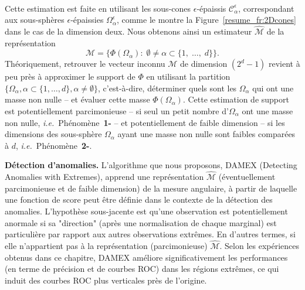 \documentclass[a4paper, 12pt]{article}
\newcommand{\ie}{\emph{i.e.}{}}
\def\cone{\mathcal{C}}
\begin{document}
~\\
Cette estimation est faite en utilisant les sous-cones $\epsilon$-épaissis $\cone_\alpha^\epsilon$, correspondant aux sous-sphères $\epsilon$-épaissies $\Omega_\alpha^\epsilon$, comme le montre la Figure~\ref{resume_fr:2Dcones} dans le cas de la dimension deux.
Nous obtenons ainsi un estimateur $\widehat{\mathcal{M}}$ de la représentation
$$\mathcal{M} = \{ \Phi(\Omega_{\alpha}):\; \emptyset \neq \alpha\subset\{1,\; \ldots,\; d \}\}.$$
Théoriquement, retrouver le vecteur inconnu $\mathcal{M}$ de dimension $(2^{d}-1)$ revient à peu près à approximer le support de $\Phi$ en utilisant la partition
$\{\Omega_\alpha, \alpha\subset\{1,\ldots,d\}, \alpha\neq \emptyset\}$, c'est-à-dire, déterminer quels sont les $\Omega_\alpha$ qui ont
une masse non nulle -- et évaluer cette masse $\Phi(\Omega_\alpha)$. %
Cette estimation de support est potentiellement parcimonieuse -- si seul un petit nombre d'$\Omega_\alpha$ ont une masse non nulle, \ie~Phénomène~\textbf{1-} -- et
potentiellement de faible dimension -- si les dimensions des sous-sphère $\Omega_\alpha$ ayant une masse non nulle sont faibles comparées à $d$, \ie~Phénomène~\textbf{2-}.



\textbf{Détection d'anomalies.}
L'algorithme que nous proposons, DAMEX (Detecting Anomalies with Extremes), apprend une représentation $\widehat{\mathcal{M}}$ (éventuellement parcimonieuse et de faible dimension) de la mesure angulaire, à partir de laquelle une fonction de score peut être définie dans le contexte de la détection des anomalies.
L'hypothèse sous-jacente est qu'une observation est potentiellement anormale si sa "direction" (après une normalisation de chaque marginal) est particulière par rapport aux autres observations extrêmes. En d'autres termes, si elle n'appartient pas à la représentation (parcimonieuse) $\widehat {\mathcal {M}} $. %
Selon les expériences obtenus dans ce chapitre, DAMEX améliore significativement les performances (en terme de précision et de courbes ROC) dans les régions extrêmes, ce qui induit des courbes ROC plus verticales près de l'origine.
\end{document}
